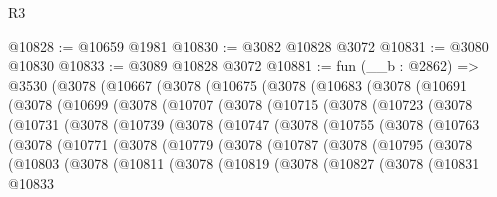 \begin{lexlean}{R3}
\begin{coremodule}
@10828 := @10659 @1981
@10830 := @3082 @10828 @3072
@10831 := @3080 @10830
@10833 := @3089 @10828 @3072
@10881 := fun (__b : @2862) =>
  @3530
    (@3078
      (@10667
        (@3078
          (@10675
            (@3078
              (@10683
                (@3078
                  (@10691
                    (@3078
                      (@10699
                        (@3078
                          (@10707
                            (@3078
                              (@10715
                                (@3078
                                  (@10723
                                    (@3078
                                      (@10731
                                        (@3078
                                          (@10739
                                            (@3078
                                              (@10747
                                                (@3078
                                                  (@10755
                                                    (@3078
                                                      (@10763
                                                        (@3078
                                                          (@10771
                                                            (@3078
                                                              (@10779
                                                                (@3078
                                                                  (@10787
                                                                    (@3078
                                                                      (@10795
                                                                        (@3078
                                                                          (@10803
                                                                            (@3078
                                                                              (@10811
                                                                                (@3078
                                                                                  (@10819
                                                                                    (@3078
                                                                                      (@10827
                                                                                        (@3078
                                                                                          (@10831
                                                                                            @10833

\end{coremodule}
\end{lexlean}
